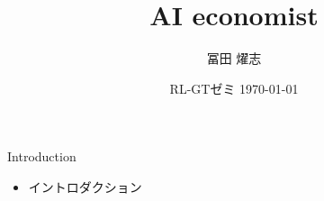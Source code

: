 \documentclass[unicode,aspectratio=169,11pt]{beamer}
\title{AI economist}
\author{冨田 燿志}
\date{RL-GTゼミ \today}
\begin{document}
\maketitle

\begin{frame}{Introduction}
    \begin{itemize}
        \item イントロダクション
    \end{itemize}
\end{frame}
\end{document}
